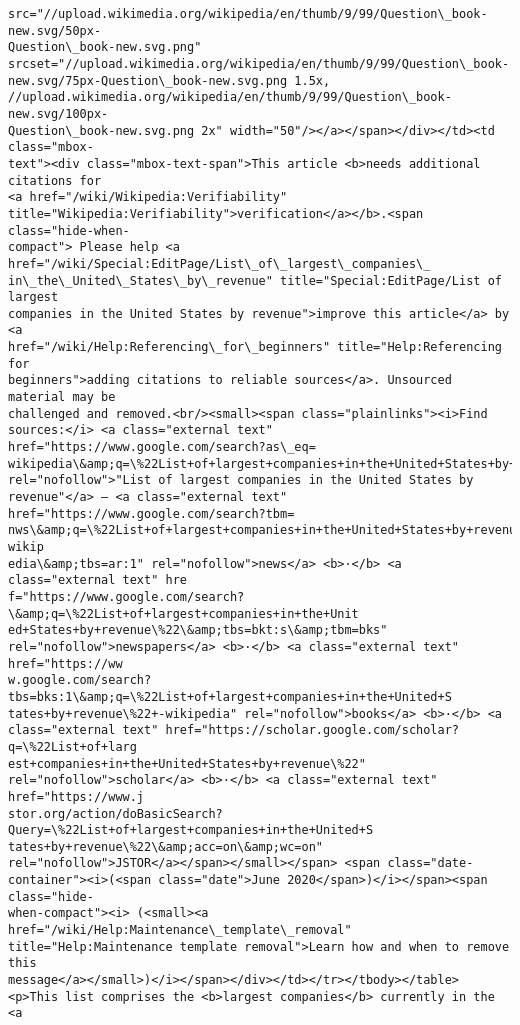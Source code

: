 \documentclass[11pt]{article}
\begin{document}
\begin{Verbatim}[commandchars=\\\{\}]
src="//upload.wikimedia.org/wikipedia/en/thumb/9/99/Question\_book-new.svg/50px-
Question\_book-new.svg.png"
srcset="//upload.wikimedia.org/wikipedia/en/thumb/9/99/Question\_book-
new.svg/75px-Question\_book-new.svg.png 1.5x,
//upload.wikimedia.org/wikipedia/en/thumb/9/99/Question\_book-new.svg/100px-
Question\_book-new.svg.png 2x" width="50"/></a></span></div></td><td class="mbox-
text"><div class="mbox-text-span">This article <b>needs additional citations for
<a href="/wiki/Wikipedia:Verifiability"
title="Wikipedia:Verifiability">verification</a></b>.<span class="hide-when-
compact"> Please help <a href="/wiki/Special:EditPage/List\_of\_largest\_companies\_
in\_the\_United\_States\_by\_revenue" title="Special:EditPage/List of largest
companies in the United States by revenue">improve this article</a> by <a
href="/wiki/Help:Referencing\_for\_beginners" title="Help:Referencing for
beginners">adding citations to reliable sources</a>. Unsourced material may be
challenged and removed.<br/><small><span class="plainlinks"><i>Find
sources:</i> <a class="external text" href="https://www.google.com/search?as\_eq=
wikipedia\&amp;q=\%22List+of+largest+companies+in+the+United+States+by+revenue\%22"
rel="nofollow">"List of largest companies in the United States by
revenue"</a> – <a class="external text" href="https://www.google.com/search?tbm=
nws\&amp;q=\%22List+of+largest+companies+in+the+United+States+by+revenue\%22+-wikip
edia\&amp;tbs=ar:1" rel="nofollow">news</a> <b>·</b> <a class="external text" hre
f="https://www.google.com/search?\&amp;q=\%22List+of+largest+companies+in+the+Unit
ed+States+by+revenue\%22\&amp;tbs=bkt:s\&amp;tbm=bks"
rel="nofollow">newspapers</a> <b>·</b> <a class="external text" href="https://ww
w.google.com/search?tbs=bks:1\&amp;q=\%22List+of+largest+companies+in+the+United+S
tates+by+revenue\%22+-wikipedia" rel="nofollow">books</a> <b>·</b> <a
class="external text" href="https://scholar.google.com/scholar?q=\%22List+of+larg
est+companies+in+the+United+States+by+revenue\%22"
rel="nofollow">scholar</a> <b>·</b> <a class="external text" href="https://www.j
stor.org/action/doBasicSearch?Query=\%22List+of+largest+companies+in+the+United+S
tates+by+revenue\%22\&amp;acc=on\&amp;wc=on"
rel="nofollow">JSTOR</a></span></small></span> <span class="date-
container"><i>(<span class="date">June 2020</span>)</i></span><span class="hide-
when-compact"><i> (<small><a href="/wiki/Help:Maintenance\_template\_removal"
title="Help:Maintenance template removal">Learn how and when to remove this
message</a></small>)</i></span></div></td></tr></tbody></table>
<p>This list comprises the <b>largest companies</b> currently in the <a

\end{Verbatim}
\end{document}
